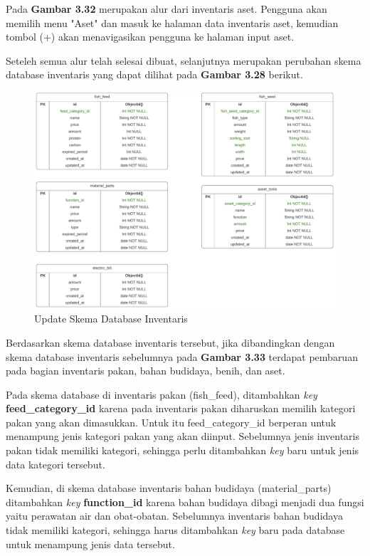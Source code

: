 \begin{spacing}{1.5}
	Pada \textbf{Gambar 3.32} merupakan alur dari inventaris aset. Pengguna akan memilih menu "Aset" dan masuk ke halaman data inventaris aset, kemudian tombol (+) akan menavigasikan pengguna ke halaman input aset.

	Seteleh semua alur telah selesai dibuat, selanjutnya merupakan perubahan skema database inventaris yang dapat dilihat pada \textbf{Gambar 3.28} berikut.

	\begin{figure}[H]
		\centering
		\includegraphics[width=1\textwidth]{gambar/sprint2/inventory_schema.jpeg}
		\caption{Update Skema Database Inventaris}
	\end{figure}

	Berdasarkan skema database inventaris tersebut, jika dibandingkan dengan skema database inventaris sebelumnya pada \textbf{Gambar 3.33} terdapat pembaruan pada bagian inventaris pakan, bahan budidaya, benih, dan aset.

	Pada skema database di inventaris pakan (fish\_feed), ditambahkan \textit{key} \textbf{feed\_category\_id} karena pada inventaris pakan diharuskan memilih kategori pakan yang akan dimasukkan. Untuk itu feed\_category\_id berperan untuk menampung jenis kategori pakan yang akan diinput. Sebelumnya jenis inventaris pakan tidak memiliki kategori, sehingga perlu ditambahkan \textit{key} baru untuk jenis data kategori tersebut.

	Kemudian, di skema database inventaris bahan budidaya (material\_parts) ditambahkan \textit{key} \textbf{function\_id} karena bahan budidaya dibagi menjadi dua fungsi yaitu perawatan air dan obat-obatan. Sebelumnya inventaris bahan budidaya tidak memiliki kategori, sehingga harus ditambahkan \textit{key} baru pada database untuk menampung jenis data tersebut.


\end{spacing}
